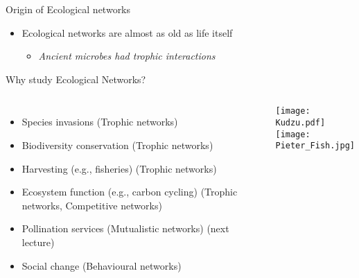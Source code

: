 \begin{frame}{Origin of Ecological networks}

  \begin{center}
    
  \end{center}
  \vspace{-10pt}
  
  \begin{itemize}
    \item Ecological networks are almost as old as life itself
    \begin{itemize}
      \item \it Ancient microbes had trophic interactions
    \end{itemize}
  \end{itemize}
  
  \end{frame}

\begin{frame}{Why study Ecological Networks?}

  \pause
  
  \begin{columns}[c]
      \begin{itemize}[<+->]\setlength{\itemindent}{0em}\itemsep4pt
        \item Species invasions (Trophic networks)
        \item Biodiversity conservation (Trophic  networks)
        \item Harvesting (e.g., fisheries) (Trophic networks)
        \item Ecosystem function (e.g., carbon cycling) (Trophic networks, Competitive networks) 
        \item Pollination services (Mutualistic networks) (next lecture)
        \item Social change (Behavioural networks)
      \end{itemize}
    \centering
    \texttt{[image: Kudzu.pdf]}\\	
    \vspace{6pt}
    \texttt{[image: Pieter\_Fish.jpg]}		
  \end{columns}
  
  \end{frame}  

